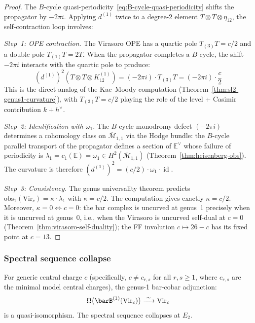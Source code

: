 \begin{proof}
The $B$-cycle quasi-periodicity~\eqref{eq:B-cycle-quasi-periodicity}
shifts the propagator by $-2\pi i$.  Applying $d^{(1)}$ twice to a
degree-2 element $T \otimes T \otimes \eta_{12}$, the self-contraction
loop involves:

\emph{Step~1: OPE contraction.}
The Virasoro OPE has a quartic pole $T_{(3)}T = c/2$ and a double pole
$T_{(1)}T = 2T$.  When the propagator completes a $B$-cycle, the
shift $-2\pi i$ interacts with the quartic pole to produce:
\begin{equation}
(d^{(1)})^2(T \otimes T \otimes K^{(1)}_{12})
= (-2\pi i) \cdot T_{(3)}T = (-2\pi i) \cdot \frac{c}{2}
\end{equation}
This is the direct analog of the Kac--Moody computation
(Theorem~\ref{thm:sl2-genus1-curvature}), with $T_{(3)}T = c/2$ playing
the role of the level + Casimir contribution $k + h^\vee$.

\emph{Step~2: Identification with $\omega_1$.}
The $B$-cycle monodromy defect $(-2\pi i)$ determines a cohomology
class on $\overline{\mathcal{M}}_{1,1}$ via the Hodge bundle: the
$B$-cycle parallel transport of the propagator defines a section of
$\mathbb{E}^\vee$ whose failure of periodicity is $\lambda_1 = c_1(\mathbb{E})
= \omega_1 \in H^2(\overline{\mathcal{M}}_{1,1})$
(Theorem~\ref{thm:heisenberg-obs}).
The curvature is therefore
$(d^{(1)})^2 = (c/2) \cdot \omega_1 \cdot \operatorname{id}$.

\emph{Step~3: Consistency.}
The genus universality theorem predicts
$\mathrm{obs}_1(\mathrm{Vir}_c) = \kappa \cdot \lambda_1$ with
$\kappa = c/2$.  The computation gives exactly $\kappa = c/2$.
Moreover, $\kappa = 0 \iff c = 0$: the bar complex is uncurved at
genus~1 precisely when it is uncurved at genus~0, i.e., when the
Virasoro is uncurved self-dual at $c=0$ (Theorem~\ref{thm:virasoro-self-duality}); the FF involution $c \mapsto 26-c$ has its fixed point at $c=13$.
\end{proof}

\subsubsection{Spectral sequence collapse}

\begin{theorem}
\label{thm:vir-genus1-inversion}
For generic central charge $c$ (specifically, $c \neq c_{r,s}$ for all
$r, s \geq 1$, where $c_{r,s}$ are the minimal model central charges),
the genus-1 bar-cobar adjunction:
\begin{equation}
\Omega\bigl(\barB^{(1)}(\mathrm{Vir}_c)\bigr) \xrightarrow{\;\sim\;} \mathrm{Vir}_c
\end{equation}
is a quasi-isomorphism.  The spectral sequence collapses at $E_2$.
\end{theorem}

